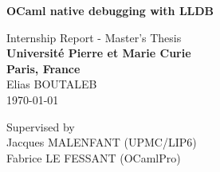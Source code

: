 \thispagestyle{empty}
\begin{center}

\vspace*{1.4cm}
{\LARGE \textbf{OCaml native debugging with LLDB}}

\begin{figure}
    \centering
    \hspace{1em}
    \hfill
\end{figure}

\vspace*{1.0cm}

{\LARGE Internship Report - Master's Thesis}\\

\vspace{1.0cm}
{\LARGE \textbf{Université Pierre et Marie Curie}}\\
\vspace*{0.3cm}
{\LARGE \textbf{Paris, France}}\\
\vspace*{1.0cm}
{\LARGE Elias BOUTALEB}
\\
\vspace*{0.5cm}
\today
\vspace*{1.0cm}

Supervised by\\
    Jacques MALENFANT (UPMC/LIP6)\\
    Fabrice LE FESSANT (OCamlPro)\\
\vspace*{0.5cm}
\vspace{3cm}


\end{center}

